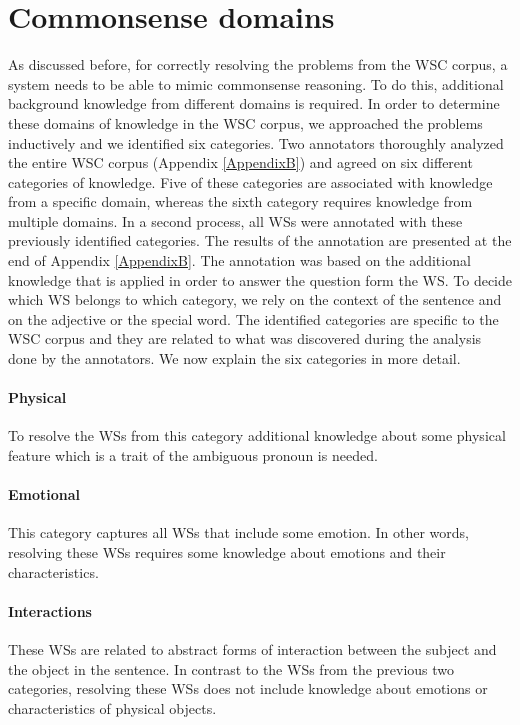 \section{Commonsense domains}
As discussed before, for correctly resolving the problems from the WSC corpus, a system needs to be able to mimic commonsense reasoning. To do this, additional background knowledge from different domains is required. In order to determine these domains of knowledge in the WSC corpus, we approached the problems inductively and we identified six categories. Two annotators thoroughly analyzed the entire WSC corpus (Appendix \ref{AppendixB}) and agreed on six different categories of knowledge. Five of these categories are associated with knowledge from a specific domain, whereas the sixth category requires knowledge from multiple domains.
In a second process, all WSs were annotated with these previously identified categories. The results of the annotation are presented at the end of Appendix \ref{AppendixB}. The annotation was based on the additional knowledge that is applied in order to answer the question form the WS. To decide which WS belongs to which category, we rely on the context of the sentence and on the adjective or the special word. The identified categories are specific to the WSC corpus and they are related to what was discovered during the analysis done by the annotators. We now explain the six categories in more detail. 

\paragraph{Physical} To resolve the WSs from this category additional knowledge about some physical feature which is a trait of the ambiguous pronoun is needed.
 
\paragraph{Emotional} This category captures all WSs that include some emotion. In other words, resolving these WSs requires some knowledge about emotions and their characteristics.

\paragraph{Interactions} These WSs are related to abstract forms of interaction between the subject and the object in the sentence. In contrast to the WSs from the previous two categories, resolving these WSs does not include knowledge about emotions or characteristics of physical objects.

